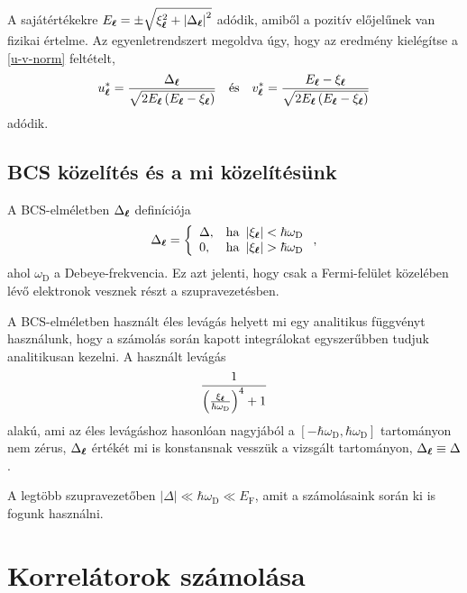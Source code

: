 \documentclass[a4paper,12pt,titlepage]{article}
\newcommand{\LL}{{\vb*{\ell}}}
\begin{document}
A sajátértékekre $E_\LL = \pm \sqrt{\xi_\LL^2 + \left| \Delta_\LL \right|^2}$ adódik, amiből a pozitív előjelűnek van fizikai értelme.  Az egyenletrendszert megoldva úgy, hogy az eredmény kielégítse a \eqref{u-v-norm} feltételt,
\begin{equation}
	u_\LL^* = \frac{\Delta_\LL}{\sqrt{2 E_\LL \left( E_\LL - \xi_\LL \right)}} ~~~ \text{és} ~~~ v_\LL^* = \frac{E_\LL - \xi_\LL}{\sqrt{2 E_\LL \left( E_\LL - \xi_\LL \right)}}
\end{equation}
adódik.


\subsection{BCS közelítés és a mi közelítésünk}

A BCS-elméletben $\Delta_\LL$ definíciója
\begin{equation}
	\Delta_\LL = \left\{ \begin{array}{ll} \Delta, & \text{ha } \left| \xi_\LL \right| < \hbar \omega_\text{D} \\ 0, & \text{ha } \left| \xi_\LL \right| > \hbar \omega_\text{D} \end{array} \right. ,
\end{equation}
ahol $\omega_\text{D}$ a Debeye-frekvencia.  Ez azt jelenti, hogy csak a Fermi-felület közelében lévő elektronok vesznek részt a szupravezetésben.

A BCS-elméletben használt éles levágás helyett mi egy analitikus függvényt használunk, hogy a számolás során kapott integrálokat egyszerűbben tudjuk analitikusan kezelni.  A használt levágás
$$ \frac{1}{\left( \frac{\xi_\LL}{\hbar \omega_\text{D}} \right)^4 + 1} $$
alakú, ami az éles levágáshoz hasonlóan nagyjából a $\left[ -\hbar \omega_\text{D}, \hbar \omega_\text{D} \right]$ tartományon nem zérus, $\Delta_\LL$ értékét mi is konstansnak vesszük a vizsgált tartományon, $\Delta_\LL \equiv \Delta$.

A legtöbb szupravezetőben $\left|\Delta\right| \ll \hbar \omega_\text{D} \ll E_\text{F}$, amit a számolásaink során ki is fogunk használni.



\section{Korrelátorok számolása}
\end{document}
